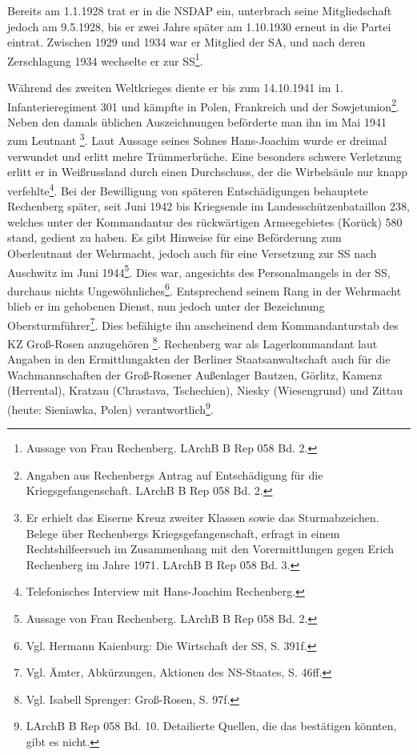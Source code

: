 Bereits am 1.1.1928 trat er in die NSDAP ein, unterbrach seine Mitgliedschaft jedoch am 9.5.1928, bis  er zwei Jahre später am 1.10.1930 erneut in die Partei eintrat. Zwischen 1929 und 1934 war er Mitglied der SA, und nach deren Zerschlagung 1934 wechselte er zur SS\footnote{Aussage von Frau Rechenberg. LArchB B Rep 058 Bd. 2.}.

Während des zweiten Weltkrieges diente er bis zum 14.10.1941 im 1. Infanterieregiment 301 und kämpfte in Polen, Frankreich und der Sowjetunion\footnote{Angaben aus Rechenbergs Antrag auf Entschädigung für die Kriegsgefangenschaft. LArchB B Rep 058 Bd. 2.}. Neben den damals üblichen Auszeichnungen beförderte man ihn im Mai 1941 zum Leutnant
\footnote{Er erhielt das Eiserne Kreuz zweiter Klassen sowie das Sturmabzeichen. Belege über Rechenbergs Kriegsgefangenschaft, erfragt in einem Rechtshilfeersuch im Zusammenhang mit den Vorermittlungen gegen Erich Rechenberg im Jahre 1971. LArchB B Rep 058 Bd. 3.}.
Laut Aussage seines Sohnes Hans-Joachim wurde er dreimal verwundet und erlitt mehre Trümmerbrüche. Eine besonders schwere Verletzung erlitt er in Weißrussland durch einen Durchschuss, der die Wirbelsäule nur knapp verfehlte\footnote{Telefonisches Interview mit Hans-Joachim Rechenberg.}. Bei der Bewilligung von späteren Entschädigungen behauptete Rechenberg später, seit Juni 1942 bis Kriegsende im Landesschützenbataillon 238, welches unter der Kommandantur des rückwärtigen Armeegebietes (Korück) 580 stand, gedient zu haben.
Es gibt Hinweise für eine Beförderung zum Oberleutnant der Wehrmacht, jedoch auch für eine Versetzung zur SS nach Auschwitz im Juni 1944\footnote{Aussage von Frau Rechenberg. LArchB B Rep 058 Bd. 2.}. Dies war, angesichts des Personalmangels in der SS, durchaus nichts Ungewöhnliches\footnote{Vgl. Hermann Kaienburg: Die Wirtschaft der SS, S. 391f.}.
Entsprechend seinem Rang in der Wehrmacht blieb er im gehobenen Dienst, nun jedoch unter der Bezeichnung Obersturmführer\footnote{Vgl. Ämter, Abkürzungen, Aktionen des NS-Staates, S. 46ff.}.
Dies befähigte ihn anscheinend dem Kommandanturstab des KZ Groß-Rosen anzugehören
\footnote{Vgl. Isabell Sprenger: Groß-Rosen, S. 97f.}. Rechenberg war als Lagerkommandant laut Angaben in den Ermittlungakten der Berliner Staatsanwaltschaft auch für die Wachmannschaften der Groß-Rosener Außenlager Bautzen, Görlitz, Kamenz (Herrental), Kratzau (Chrastava, Tschechien), Niesky (Wiesengrund) und Zittau (heute: Sieniawka, Polen) verantwortlich\footnote{LArchB B Rep 058 Bd. 10. Detailierte Quellen, die das bestätigen könnten, gibt es nicht.}.
